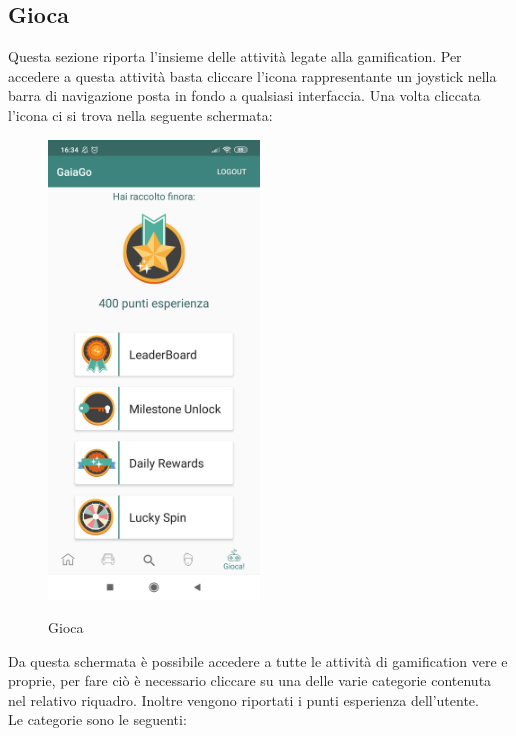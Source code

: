 \subsection{Gioca}
Questa sezione riporta l'insieme delle attività legate alla gamification. Per accedere a questa attività basta cliccare l'icona rappresentante un joystick nella barra di navigazione posta in fondo a qualsiasi interfaccia.
Una volta cliccata l'icona ci si trova nella seguente schermata:
\begin{figure}[H] 
	\centering 
	\includegraphics[width=0.5\textwidth]{res/images/gamification.png}\\
	\caption{Gioca}
	\label{gamification}
\end{figure}
\pagebreak
Da questa schermata è possibile accedere a tutte le attività di gamification vere e proprie, per fare ciò è necessario cliccare su una delle varie categorie contenuta nel relativo riquadro. Inoltre vengono riportati i punti esperienza dell'utente.\\
Le categorie sono le seguenti:
